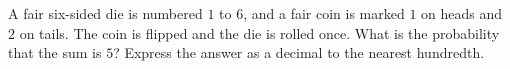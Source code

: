 A fair six-sided die is numbered $1$ to $6$, and a fair coin is marked $1$ on heads and $2$ on tails. The coin is flipped and the die is rolled once. What is the probability that the sum is $5$? Express the answer as a decimal to the nearest hundredth.
